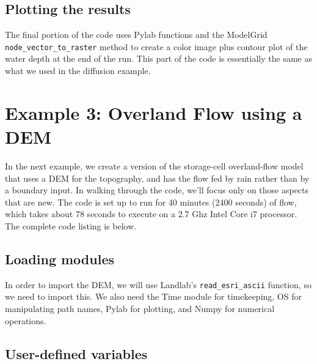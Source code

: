 \documentclass[12pt]{article}
\newcommand{\code}[1]{{\tt #1}}
\begin{document}
\subsection{Plotting the results}



The final portion of the code uses Pylab functions and the ModelGrid \code{node\_vector\_to\_raster} method to create a color image plus contour plot of the water depth at the end of the run. This part of the code is essentially the same as what we used in the diffusion example.



\section{Example 3: Overland Flow using a DEM}

In the next example, we create a version of the storage-cell overland-flow model that uses a DEM for the topography, and has the flow fed by rain rather than by a boundary input. In walking through the code, we'll focus only on those aspects that are new. The code is set up to run for 40 minutes (2400 seconds) of flow, which takes about 78 seconds to execute on a 2.7 Ghz Intel Core i7 processor.
The complete code listing is below.



\subsection{Loading modules}



In order to import the DEM, we will use Landlab's \code{read\_esri\_ascii} function, so we need to import this. We also need the Time module for timekeeping, OS for manipulating path names, Pylab for plotting, and Numpy for numerical operations. 

\subsection{User-defined variables}


\end{document}
